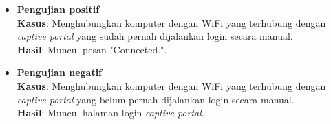 \begin{itemize}
{        \begin{itemize}
            \item{
                \textbf{Pengujian positif}\\
                \textbf{Kasus}: Menghubungkan komputer dengan WiFi yang terhubung dengan \textit{captive portal} yang sudah pernah dijalankan login secara manual.\\
                \textbf{Hasil}: Muncul pesan "Connected.".
            }
            \item{
                \textbf{Pengujian negatif}\\
                \textbf{Kasus}: Menghubungkan komputer dengan WiFi yang terhubung dengan \textit{captive portal} yang belum pernah dijalankan login secara manual.\\
                \textbf{Hasil}: Muncul halaman login \textit{captive portal}.
            }
        \end{itemize}
    }
\end{itemize}